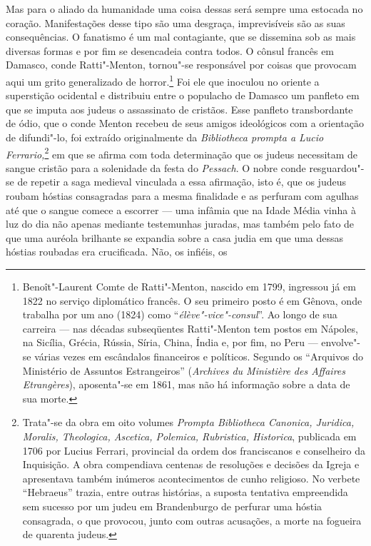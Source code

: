  Mas para o aliado da humanidade uma coisa dessas será sempre uma
estocada no coração. Manifestações desse tipo são uma desgraça,
imprevisíveis são as suas consequências. O fanatismo é um mal
contagiante, que se dissemina sob as mais diversas formas e por fim se
desencadeia contra todos. O cônsul francês em Damasco, conde
Ratti"-Menton, tornou"-se responsável por coisas que provocam aqui um
grito generalizado de horror.\footnote{ Benoît"-Laurent Comte de
Ratti"-Menton, nascido em 1799, ingressou já em 1822 no serviço
diplomático francês. O seu primeiro posto é em Gênova, onde trabalha
por um ano (1824) como “\textit{élève"-vice"-consul}”. Ao longo de
sua carreira --- nas décadas subseqüentes Ratti"-Menton tem postos em
Nápoles, na Sicília, Grécia, Rússia, Síria, China, Índia e, por fim, no
Peru --- envolve"-se várias vezes em escândalos financeiros e políticos.
Segundo os “Arquivos do Ministério de Assuntos Estrangeiros”
(\textit{Archives du Ministière des Affaires Etrangères}),
aposenta"-se em 1861, mas não há informação sobre a data de sua morte.} 
Foi ele que inoculou no oriente a superstição ocidental e
distribuiu entre o populacho de Damasco um panfleto em que se imputa
aos judeus o assassinato de cristãos. Esse panfleto transbordante de
ódio, que o conde Menton recebeu de seus amigos ideológicos com a
orientação de difundi"-lo, foi extraído originalmente da
\textit{Bibliotheca prompta a Lucio Ferrario,}\footnote{ Trata"-se da
obra em oito volumes \textit{Prompta Bibliotheca Canonica, Juridica,
Moralis, Theologica, Ascetica, Polemica, Rubristica, Historica},
publicada em 1706 por Lucius Ferrari, provincial da ordem dos
franciscanos e conselheiro da Inquisição. A obra compendiava centenas
de resoluções e decisões da Igreja e apresentava também inúmeros
acontecimentos de cunho religioso. No verbete “Hebraeus” trazia, entre
outras histórias, a suposta tentativa empreendida sem sucesso por um
judeu em Brandenburgo de perfurar uma hóstia consagrada, o que
provocou, junto com outras acusações, a morte na fogueira de quarenta
judeus.} em que se afirma com toda determinação que os judeus
necessitam de sangue cristão para a solenidade da festa do
\textit{Pessach}. O nobre conde resguardou"-se de repetir a saga
medieval vinculada a essa afirmação, isto é, que os judeus roubam
hóstias consagradas para a mesma finalidade e as perfuram com agulhas
até que o sangue comece a escorrer --- uma infâmia que na Idade Média
vinha à luz do dia não apenas mediante testemunhas juradas, mas também
pelo fato de que uma auréola brilhante se expandia sobre a casa judia
em que uma dessas hóstias roubadas era crucificada. Não, os infiéis, os
